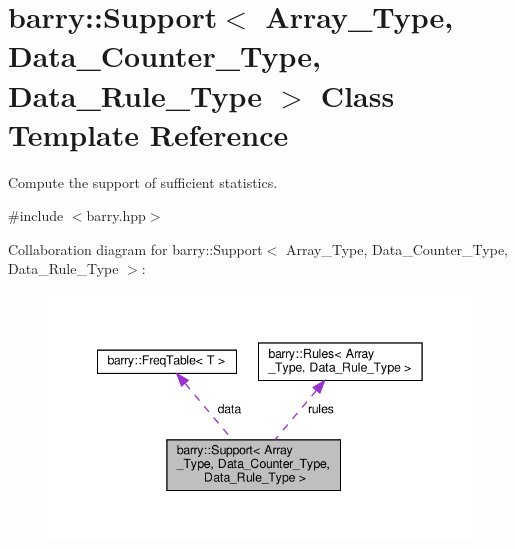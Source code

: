 \hypertarget{classbarry_1_1_support}{}\section{barry\+:\+:Support$<$ Array\+\_\+\+Type, Data\+\_\+\+Counter\+\_\+\+Type, Data\+\_\+\+Rule\+\_\+\+Type $>$ Class Template Reference}
\label{classbarry_1_1_support}


Compute the support of sufficient statistics.  




{\ttfamily \#include $<$barry.\+hpp$>$}



Collaboration diagram for barry\+:\+:Support$<$ Array\+\_\+\+Type, Data\+\_\+\+Counter\+\_\+\+Type, Data\+\_\+\+Rule\+\_\+\+Type $>$\+:
\nopagebreak
\begin{figure}[H]
\begin{center}
\leavevmode
\includegraphics[width=342pt]{classbarry_1_1_support__coll__graph}
\end{center}
\end{figure}
